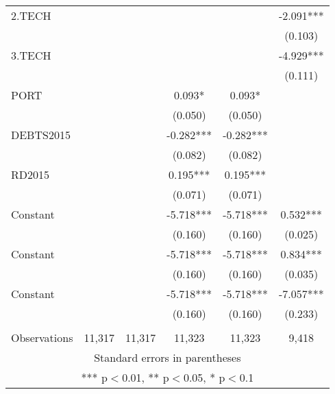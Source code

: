 \documentclass[]{article}
\begin{document}
\begin{tabular}{lccccc}
2.TECH &  &  &  &  & -2.091*** \\
 &  &  &  &  & (0.103) \\
3.TECH &  &  &  &  & -4.929*** \\
 &  &  &  &  & (0.111) \\
PORT &  &  & 0.093* & 0.093* &  \\
 &  &  & (0.050) & (0.050) &  \\
DEBTS2015 &  &  & -0.282*** & -0.282*** &  \\
 &  &  & (0.082) & (0.082) &  \\
RD2015 &  &  & 0.195*** & 0.195*** &  \\
 &  &  & (0.071) & (0.071) &  \\
Constant &  &  & -5.718*** & -5.718*** & 0.532*** \\
 &  &  & (0.160) & (0.160) & (0.025) \\
Constant &  &  & -5.718*** & -5.718*** & 0.834*** \\
 &  &  & (0.160) & (0.160) & (0.035) \\
Constant &  &  & -5.718*** & -5.718*** & -7.057*** \\
 &  &  & (0.160) & (0.160) & (0.233) \\
 &  &  &  &  &  \\
 Observations & 11,317 & 11,317 & 11,323 & 11,323 & 9,418 \\ \hline
\multicolumn{6}{c}{ Standard errors in parentheses} \\
\multicolumn{6}{c}{ *** p$<$0.01, ** p$<$0.05, * p$<$0.1} \\
\end{tabular}
\end{document}
